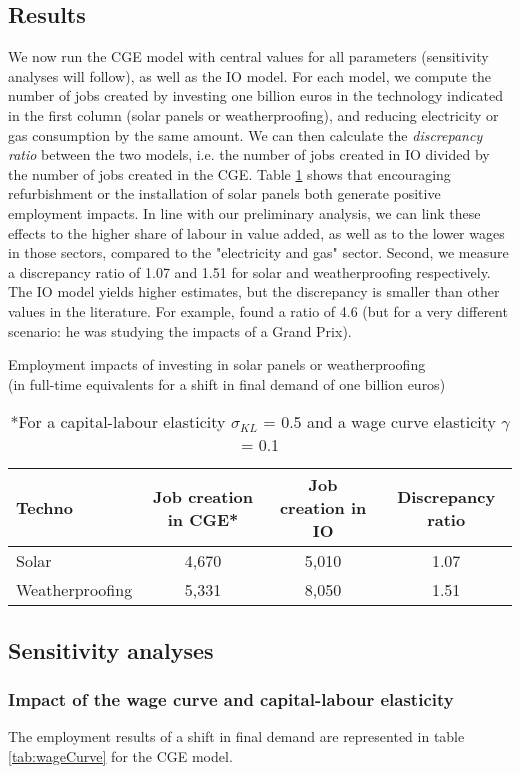 \subsection{Results}
We now run the CGE model with central values for all parameters (sensitivity analyses will follow), as well as the IO model. 
For each model, we compute the number of jobs created by investing one billion euros in the technology indicated in the first column (solar panels or weatherproofing), and reducing electricity or gas consumption by the same amount.
We can then calculate the \textit{discrepancy ratio} between the two models, i.e. the number of jobs created in IO divided by the number of jobs created in the CGE.
Table \ref{tab:results} shows that encouraging refurbishment or the installation of solar panels both generate positive employment impacts.
In line with our preliminary analysis, we can link these effects to the higher share of labour in value added, as well as to the lower wages in those sectors, compared to the "electricity and gas" sector.
Second, we measure a discrepancy ratio of 1.07 and 1.51 for solar and weatherproofing respectively. The IO model yields higher estimates, but the discrepancy is smaller than other values in the literature. For example, \citet{Dwyer2005} found a ratio of 4.6 (but for a very different scenario: he was studying the impacts of a Grand Prix).

\begin{table}[!h]
	\centering
	\caption{Employment impacts of investing in solar panels or weatherproofing \\ (in full-time equivalents for a shift in final demand of one billion euros)}
	\label{tab:results}
	\begin{tabular}{lccc}
		\toprule
		Techno & Job creation in CGE* & Job creation in IO & Discrepancy ratio \\
		\midrule
		Solar & 4,670 & 5,010 & 1.07 \\
		Weatherproofing & 5,331 & 8,050 & 1.51 \\
		\bottomrule
	\end{tabular}
	\caption*{*For a capital-labour elasticity $\sigma_{KL}$ = 0.5 and a wage curve elasticity $\gamma$ = 0.1}
\end{table}


\subsection{Sensitivity analyses}

\subsubsection{Impact of the wage curve and capital-labour elasticity}
The employment results of a shift in final demand are represented in table \ref{tab:wageCurve} for the CGE model.

